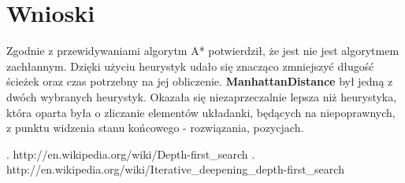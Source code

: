 \documentclass{classrep}
\begin{document}
	\section{Wnioski}
		Zgodnie z przewidywaniami algorytm A* potwierdził, że jest nie jest algorytmem zachłannym. Dzięki użyciu
		heurystyk udało się znacząco zmniejszyć długość ścieżek oraz czas potrzebny na jej obliczenie. 
		\textbf{ManhattanDistance} był jedną z dwóch wybranych heurystyk. Okazała się niezaprzeczalnie lepsza
		niż heurystyka, która oparta była o zliczanie elementów układanki, będących na niepoprawnych, z punktu
		widzenia stanu końcowego - rozwiązania, pozycjach.
	
	\begin{thebibliography}{0}
	  \bibitem. http://en.wikipedia.org/wiki/Depth-first\_search
	  \bibitem. http://en.wikipedia.org/wiki/Iterative\_deepening\_depth-first\_search   
	\end{thebibliography}
\end{document}
